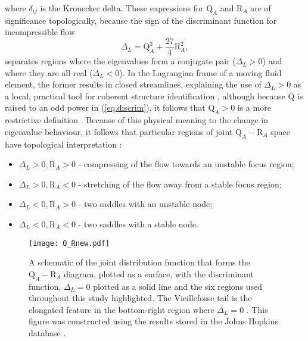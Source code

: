 \documentclass[preprint,amssymb,amsmath,aip,cha]{revtex4-1}
\begin{document}
where $\delta_{ij}$ is the Kronecker delta. These expressions for $\mbox{Q}_{A}$ and $\mbox{R}_{A}$ are of significance topologically, because the sign of the discriminant function for incompressible flow
\begin{equation}
\Delta_{L} = \mbox{Q}_{A}^{3} + \frac{27}{4}\mbox{R}_{A}^{2},
\label{eq.discrim}
\end{equation}
separates regions where the eigenvalues form a conjugate pair ($\Delta_{L} > 0$) and where they are all real ($\Delta_{L} < 0$). In the Lagrangian frame of a moving fluid element, the former results in closed streamlines, explaining the use of $\Delta_{L} > 0$ as a local, practical tool for coherent structure identification \citep{chong90}, although because $\mbox{Q}$ is raised to an odd power in (\ref{eq.discrim}), it follows that $\mbox{Q}_{A} > 0$ is a more restrictive definition \citep{hunt88,dubief00}. Because of this physical meaning to the change in eigenvalue behaviour, it follows that particular regions of joint $\mbox{Q}_{A}-\mbox{R}_{A}$ space have topological interpretation \citep{perry87}:
\begin{itemize}
\item $\Delta_{L} > 0, \mbox{R}_{A} > 0$ - compressing of the flow towards an unstable focus region;
\item $\Delta_{L} > 0, \mbox{R}_{A} < 0$ - stretching of the flow away from a stable focus region;
\item $\Delta_{L} < 0, \mbox{R}_{A} > 0$ - two saddles with an unstable node; 
\item $\Delta_{L} < 0, \mbox{R}_{A} < 0$ - two saddles with a stable node.
\end{itemize}

\begin{figure*}
  \texttt{[image: Q\_Rnew.pdf]}
\caption{A schematic of the joint distribution function that forms the $\mbox{Q}_{A}-\mbox{R}_{A}$ diagram, plotted as a surface, with the discriminant function, $\Delta_{L} = 0$ plotted as a solid line and the six regions used throughout this study highlighted. The Vieillefosse tail is the elongated feature in the bottom-right region where $\Delta_{L} = 0$ \citep{vieillefosse84}. This figure was constructed using the results stored in the Johns Hopkins database \citep{yili}.}
\label{fig.QR}       %
\end{figure*}
\end{document}

